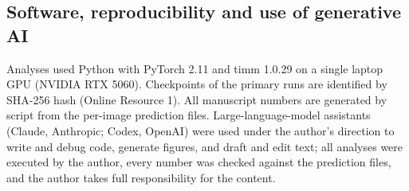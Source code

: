 \documentclass[pdflatex,sn-basic,Numbered]{sn-jnl}
\begin{document}
\subsection{Software, reproducibility and use of generative AI}

Analyses used Python with PyTorch 2.11 and timm 1.0.29 on a single laptop GPU (NVIDIA RTX 5060). Checkpoints of the primary runs are identified by SHA-256 hash (Online Resource 1). All manuscript numbers are generated by script from the per-image prediction files. Large-language-model assistants (Claude, Anthropic; Codex, OpenAI) were used under the author's direction to write and debug code, generate figures, and draft and edit text; all analyses were executed by the author, every number was checked against the prediction files, and the author takes full responsibility for the content.
\end{document}
